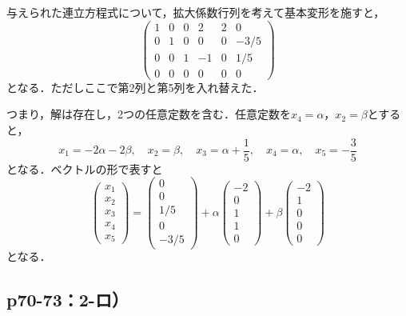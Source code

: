 \documentclass[uplatex,dvipdfmx,a4paper,10pt,fleqn]{jsarticle}
\begin{document}
\begin{tleftbar}
    与えられた連立方程式について，拡大係数行列を考えて基本変形を施すと，
    \[
        \begin{pmatrix} 1 & 0 & 0 & 2 & 2 & 0 \\ 0 & 1& 0 & 0 & 0 & -3/5 \\ 0 & 0 & 1 & -1 & 0 & 1/5 \\ 0 & 0 & 0 & 0 & 0 & 0 \end{pmatrix}
    \]
    となる．ただしここで第2列と第5列を入れ替えた．

    つまり，解は存在し，2つの任意定数を含む．任意定数を$x_4 = \alpha$，$x_2 = \beta $とすると，
    \[
        x_1 = -2 \alpha - 2 \beta , \quad x_2 =\beta , \quad x_3 = \alpha + \frac{1}{5} , \quad x_4 = \alpha , \quad x_5 = -\frac{3}{5}
    \]
    となる．ベクトルの形で表すと
    \[
        \begin{pmatrix} x_1 \\ x_2 \\ x_3 \\ x_4 \\ x_5 \end{pmatrix}= \begin{pmatrix} 0 \\ 0 \\ 1/5 \\ 0 \\ -3/5 \end{pmatrix} + \alpha \begin{pmatrix} -2 \\ 0 \\ 1 \\ 1 \\ 0 \end{pmatrix} + \beta \begin{pmatrix} -2 \\ 1 \\ 0 \\ 0 \\ 0 \end{pmatrix}
    \]
    となる．
\end{tleftbar}

\subsection*{p70-73：2-ロ）}
\end{document}
